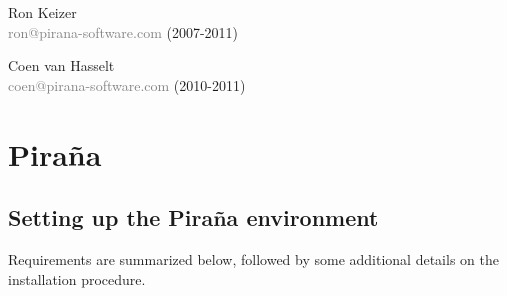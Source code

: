 \documentclass[a4,11pt]{report} \usepackage[pdftex]{graphicx}
\begin{document}
\vspace{15pt}

\noindent Ron Keizer\\
\scriptsize{\textcolor{Grey}{ron@pirana-software.com}} \normalsize (2007-2011)

\noindent Coen van Hasselt\\
\scriptsize{\textcolor{Grey}{coen@pirana-software.com}} \normalsize (2010-2011)

\pagebreak
\chapter{Pira\~na}
\section{Setting up the Pira\~na environment} Requirements are
summarized below, followed by some additional details on the
installation procedure.
\end{document}
